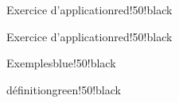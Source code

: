\documentclass{report}
\newcounter{exo}
\begin{document}
\begin{exercicebox}{Exercice d'application}{red!50!black}
\lipsum[1-2]
\end{exercicebox}
\begin{exercicebox}{Exercice d'application}{red!50!black}
\lipsum[1]
\end{exercicebox}
\setcounter{exo}{7}
\begin{exercicebox}{Exemples}{blue!50!black}
\lipsum[1]
\end{exercicebox}
\setcounter{exo}{0}
\begin{exercicebox}{définition}{green!50!black}
\lipsum[1]
\end{exercicebox}
\end{document}
